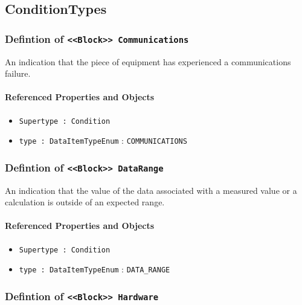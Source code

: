 \subsection{ConditionTypes} \label{model:ConditionTypes}
\subsubsection{Defintion of \texttt{<<Block>> Communications}}
  \label{type:Communications}

\FloatBarrier

An indication that the piece of equipment has experienced a communications failure.

\FloatBarrier
\paragraph{Referenced Properties and Objects}

\begin{itemize}
\item \texttt{Supertype : Condition}

\item \texttt{type : DataItemTypeEnum} : \texttt{COMMUNICATIONS}

\end{itemize}
\FloatBarrier
\subsubsection{Defintion of \texttt{<<Block>> DataRange}}
  \label{type:DataRange}

\FloatBarrier

An indication that the value of the data associated with a measured value or a calculation is outside of an expected range.

\FloatBarrier
\paragraph{Referenced Properties and Objects}

\begin{itemize}
\item \texttt{Supertype : Condition}

\item \texttt{type : DataItemTypeEnum} : \texttt{DATA_RANGE}

\end{itemize}
\FloatBarrier
\subsubsection{Defintion of \texttt{<<Block>> Hardware}}
  \label{type:Hardware}

